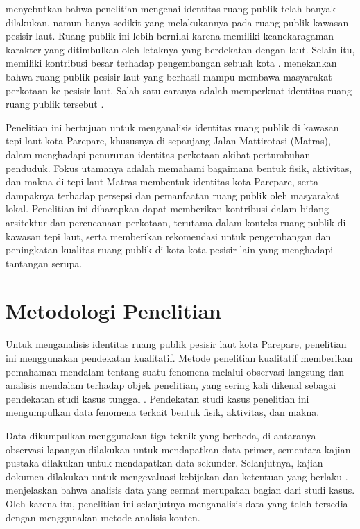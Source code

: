 \documentclass[11pt]{simart} %
\begin{document}
\cite{oktay2015} menyebutkan bahwa penelitian mengenai identitas ruang publik telah banyak dilakukan, namun hanya sedikit yang melakukannya pada ruang publik kawasan pesisir laut. Ruang publik ini lebih bernilai karena memiliki keanekaragaman karakter yang ditimbulkan oleh letaknya yang berdekatan dengan laut. Selain itu, memiliki kontribusi besar terhadap pengembangan sebuah kota \citep{hussein2014}. \cite{hussein2014} menekankan bahwa ruang publik pesisir laut yang berhasil mampu membawa masyarakat perkotaan ke pesisir laut. Salah satu caranya adalah memperkuat identitas ruang-ruang publik tersebut \citep{oktay2002}.

Penelitian ini bertujuan untuk menganalisis identitas ruang publik di kawasan tepi laut kota Parepare, khususnya di sepanjang Jalan Mattirotasi (Matras), dalam menghadapi penurunan identitas perkotaan akibat pertumbuhan penduduk. Fokus utamanya adalah memahami bagaimana bentuk fisik, aktivitas, dan makna di tepi laut Matras membentuk identitas kota Parepare, serta dampaknya terhadap persepsi dan pemanfaatan ruang publik oleh masyarakat lokal. Penelitian ini diharapkan dapat memberikan kontribusi dalam bidang arsitektur dan perencanaan perkotaan, terutama dalam konteks ruang publik di kawasan tepi laut, serta memberikan rekomendasi untuk pengembangan dan peningkatan kualitas ruang publik di kota-kota pesisir lain yang menghadapi tantangan serupa.

% 

\section{Metodologi Penelitian}
Untuk menganalisis identitas ruang publik pesisir laut kota Parepare, penelitian ini menggunakan pendekatan kualitatif. Metode penelitian kualitatif memberikan pemahaman mendalam tentang suatu fenomena melalui observasi langsung dan analisis mendalam terhadap objek penelitian, yang sering kali dikenal sebagai pendekatan studi kasus tunggal \citep{creswell2016}. Pendekatan studi kasus penelitian ini mengumpulkan data fenomena terkait bentuk fisik, aktivitas, dan makna.

Data dikumpulkan menggunakan tiga teknik yang berbeda, di antaranya observasi lapangan dilakukan untuk mendapatkan data primer, sementara kajian pustaka dilakukan untuk mendapatkan data sekunder. Selanjutnya, kajian dokumen dilakukan untuk mengevaluasi kebijakan dan ketentuan yang berlaku \citep{iqbal2020}. \cite{wiraguna2024} menjelaskan bahwa analisis data yang cermat merupakan bagian dari studi kasus. Oleh karena itu, penelitian ini selanjutnya menganalisis data yang telah tersedia dengan menggunakan metode analisis konten.
\end{document}
